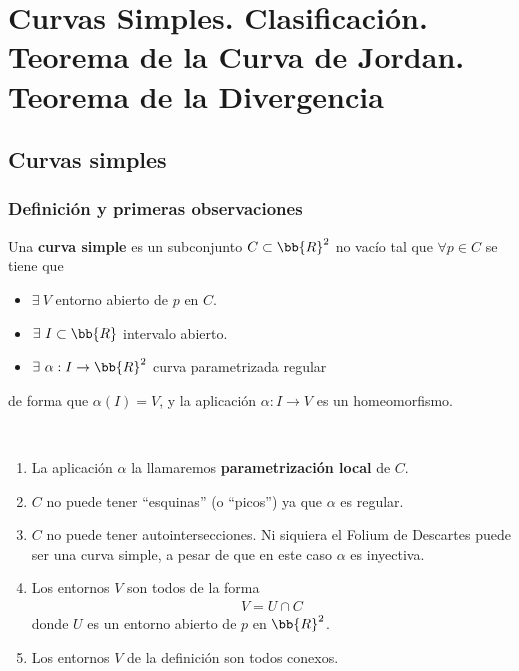\chapter{Curvas Simples. Clasificación. Teorema de la Curva de Jordan. Teorema de la Divergencia}

\section{Curvas simples}

\subsection{Definición y primeras observaciones}

\begin{definicion}
    Una \textbf{curva simple} es un subconjunto $C\subset \bb{R}^2$ no vacío tal que $\forall p\in C$ se tiene que 
    \begin{itemize}
        \item $\exists\ V$ entorno abierto de $p$ en $C$.
        \item $\exists\ I\subset \bb{R}$ intervalo abierto.
        \item $\exists\ \alpha:I \to \bb{R}^2$ curva parametrizada regular
    \end{itemize} 
    de forma que $\alpha(I)=V$, y la aplicación $\alpha:I\to V$ es un homeomorfismo.
\end{definicion}



\begin{observacion}\
    \begin{enumerate}
        \item La aplicación $\alpha$ la llamaremos \textbf{parametrización local} de $C$.
        \item $C$ no puede tener ``esquinas'' (o ``picos'') ya que $\alpha$ es regular.
        \item $C$ no puede tener autointersecciones. Ni siquiera el Folium de Descartes puede ser una curva simple, a pesar de que en este caso $\alpha$ es inyectiva.
        \item Los entornos $V$ son todos de la forma
        \begin{gather*}
            V = U\cap C
        \end{gather*}
        donde $U$ es un entorno abierto de $p$ en $\bb{R}^2$.
        \item Los entornos $V$ de la definición son todos conexos.
    \end{enumerate}
\end{observacion}

